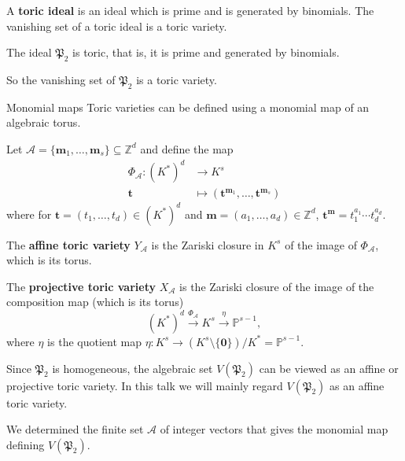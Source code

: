 \documentclass[mathserif,handout]{beamer}
\newcommand{\pr}{\mathfrak P}
\newcommand{\vect}[1]{\mathbf#1}
\newcommand{\Z}{\mathbb Z}
\newcommand{\Prj}{\mathbb P}
\begin{document}
\begin{frame}
A \textbf{toric ideal} is an ideal which is prime and is generated by binomials. The vanishing set of a toric ideal is a toric variety. 

\vspace{0.75pc}
\begin{theorem}
The ideal $\pr_2$ is toric, that is, it is prime and generated by binomials.
\end{theorem}  

So the vanishing set of $\pr_2$ is a toric variety.
\end{frame}


\begin{frame}{Monomial maps}
Toric varieties can be defined using a monomial map of an algebraic torus.

 
\vspace{0.75pc}
Let $\mathscr A=\{\vect m_1,\dots,\vect m_s\}\subseteq \Z^d$ and define the map
\begin{align*}
\Phi_{\mathscr A}: (K^*)^d &\to K^s \\
\vect t &\mapsto (\vect t^{\vect m_1},\dots,\vect t^{\vect m_s})
\end{align*}
where for $\vect t=(t_1,\dots,t_d)\in (K^*)^d$ and $\vect m=(a_1,\dots,a_d)\in \Z^d$, $\vect t^{\vect m}=t_1^{a_1}\cdots t_d^{a_d}$.
\end{frame}

\begin{frame}
The \textbf{affine toric variety} $Y_{\mathscr A}$ is the Zariski closure in $K^s$ of the image of $\Phi_{\mathscr A}$, which is its torus.


\vspace{0.75pc}
The \textbf{projective toric variety} $X_{\mathscr A}$ is the Zariski closure of the image of the composition map (which is its torus)
\[(K^\ast)^d\xrightarrow{\Phi_{\mathscr{A}}}K^s\xrightarrow{\eta}\Prj^{s-1},\]
where $\eta$ is the quotient map $\eta: K^s\to (K^s\setminus \{\vect 0\})/K^*=\Prj^{s-1}$.
\end{frame}

\begin{frame}
Since $\pr_2$ is homogeneous, the algebraic set $V(\pr_2)$ can be viewed as an affine or projective toric variety.  In this talk we will mainly regard $V(\pr_2)$ as an affine toric variety.  

\vspace{0.75pc}
We determined the finite set $\mathscr A$ of integer vectors that gives the monomial map defining $V(\pr_2)$. 
\end{frame}
\end{document}

